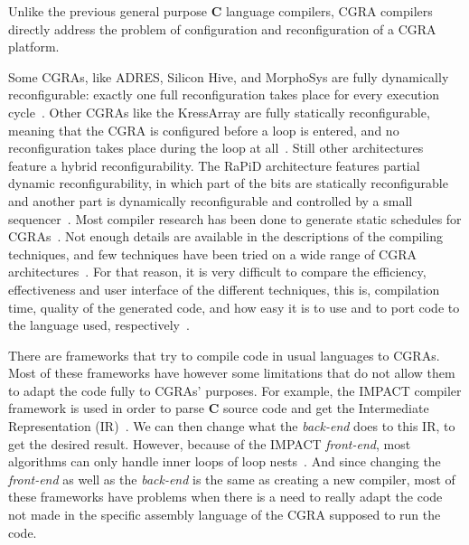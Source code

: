 Unlike the previous general purpose {\bf C} language compilers, {\sc CGRA}
compilers directly address the problem of configuration and reconfiguration of a
{\sc CGRA} platform.

Some {\sc CGRAs}, like {\sc ADRES}, Silicon Hive, and MorphoSys are fully
dynamically reconfigurable: exactly one full reconfiguration takes place for
every execution cycle~\cite{DeSutter2010}.  Other {\sc CGRAs} like the
KressArray are fully statically reconfigurable, meaning that the {\sc CGRA} is
configured before a loop is entered, and no reconfiguration takes place during
the loop at all~\cite{DeSutter2010}.  Still other architectures feature a hybrid
reconfigurability. The RaPiD architecture features partial dynamic
reconfigurability, in which part of the bits are statically reconfigurable and
another part is dynamically reconfigurable and controlled by a small
sequencer~\cite{DeSutter2010}.  Most compiler research has been done to generate
static schedules for {\sc CGRAs}~\cite{DeSutter2010}.  Not enough details are
available in the descriptions of the compiling techniques, and few techniques
have been tried on a wide range of {\sc CGRA} architectures~\cite{DeSutter2010}.
For that reason, it is very difficult to compare the efficiency, effectiveness
and user interface of the different techniques, this is, compilation time,
quality of the generated code, and how easy it is to use and to port code to the
language used, respectively~\cite{Tuhin08}.

There are frameworks that try to compile code in usual languages to {\sc CGRAs}.
Most of these frameworks have however some limitations that do not allow them to
adapt the code fully to {\sc CGRAs}' purposes.  For example, the {\sc IMPACT}
compiler framework is used in order to parse {\bf C} source code and get the
Intermediate Representation ({\sc IR})~\cite{Mei03}.  We can then change what
the {\it back-end} does to this {\sc IR}, to get the desired result.  However,
because of the {\sc IMPACT} {\it front-end}, most algorithms can only handle
inner loops of loop nests~\cite{Mei03}.  And since changing the {\it front-end}
as well as the {\it back-end} is the same as creating a new compiler, most of
these frameworks have problems when there is a need to really adapt the code not
made in the specific assembly language of the {\sc CGRA} supposed to run the
code.

